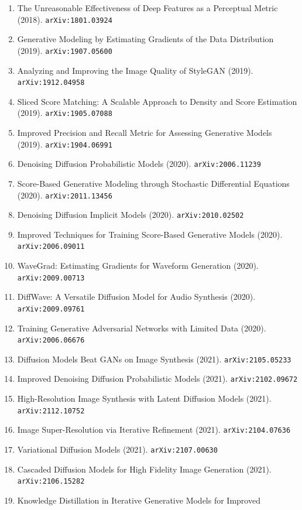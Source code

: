 \documentclass[11pt]{article}
\begin{document}
\begin{enumerate}
  \item The Unreasonable Effectiveness of Deep Features as a Perceptual Metric (2018). \texttt{arXiv:1801.03924}
  \item Generative Modeling by Estimating Gradients of the Data Distribution (2019). \texttt{arXiv:1907.05600}
  \item Analyzing and Improving the Image Quality of StyleGAN (2019). \texttt{arXiv:1912.04958}
  \item Sliced Score Matching: A Scalable Approach to Density and Score
  Estimation (2019). \texttt{arXiv:1905.07088}
  \item Improved Precision and Recall Metric for Assessing Generative Models (2019). \texttt{arXiv:1904.06991}
  \item Denoising Diffusion Probabilistic Models (2020). \texttt{arXiv:2006.11239}
  \item Score-Based Generative Modeling through Stochastic Differential
  Equations (2020). \texttt{arXiv:2011.13456}
  \item Denoising Diffusion Implicit Models (2020). \texttt{arXiv:2010.02502}
  \item Improved Techniques for Training Score-Based Generative Models (2020). \texttt{arXiv:2006.09011}
  \item WaveGrad: Estimating Gradients for Waveform Generation (2020). \texttt{arXiv:2009.00713}
  \item DiffWave: A Versatile Diffusion Model for Audio Synthesis (2020). \texttt{arXiv:2009.09761}
  \item Training Generative Adversarial Networks with Limited Data (2020). \texttt{arXiv:2006.06676}
  \item Diffusion Models Beat GANs on Image Synthesis (2021). \texttt{arXiv:2105.05233}
  \item Improved Denoising Diffusion Probabilistic Models (2021). \texttt{arXiv:2102.09672}
  \item High-Resolution Image Synthesis with Latent Diffusion Models (2021). \texttt{arXiv:2112.10752}
  \item Image Super-Resolution via Iterative Refinement (2021). \texttt{arXiv:2104.07636}
  \item Variational Diffusion Models (2021). \texttt{arXiv:2107.00630}
  \item Cascaded Diffusion Models for High Fidelity Image Generation (2021). \texttt{arXiv:2106.15282}
  \item Knowledge Distillation in Iterative Generative Models for Improved

\end{enumerate}
\end{document}
